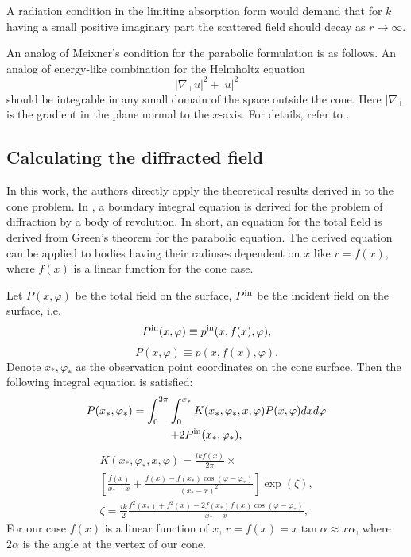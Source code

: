 \documentclass{procDDs}
\begin{document}
A radiation condition in the limiting absorption form would demand that for $k$ having a small positive imaginary part the scattered field should decay as $r \rightarrow \infty$.

An analog of Meixner's condition for the parabolic formulation is as follows. An analog of energy-like combination for the Helmholtz equation 
\begin{equation}
|\nabla_\perp u|^2 + |u|^2
\end{equation}
should be integrable in any small domain of the space outside the cone. Here $|\nabla_\perp$ is the gradient in the plane normal to the $x$-axis. For details, refer to \cite{Shanin_parabolic}.

\subsection{Calculating the diffracted field}

In this work, the authors directly apply the theoretical results derived in \cite{Shanin_parabolic} to the cone problem. In \cite{Shanin_parabolic}, a boundary integral equation is derived for the problem of diffraction by a body of revolution. In short, an equation for the total field is derived from Green's theorem for the parabolic equation. The derived equation can be applied to bodies having their radiuses dependent on $x$ like $r = f(x)$, where $f(x)$ is a linear function for the cone case.

Let $P(x,\varphi)$ be the total field on the surface, $P^{\rm in}$ be the incident field on the surface, i.e. 
\begin{equation}
P^{\rm in}(x,\varphi) \equiv p^{\rm in}(x,f(x),\varphi),
\end{equation}
\begin{equation}
P(x,\varphi) \equiv p(x,f(x),\varphi).
\end{equation}
 Denote $x_*, \varphi_*$ as the observation point coordinates on the cone surface. Then the following integral equation is satisfied:
\begin{multline}\label{int_eq} 
P(x_*, \varphi_*) = \int_{0}^{2\pi}\int_{0}^{x_*} K(x_*, \varphi_*, x, \varphi) P(x, \varphi) dx d\varphi \\
+ 2P^{\rm in}(x_*, \varphi_*),
\end{multline}
\begin{multline} \label{int_ker}                   
K(x_*, \varphi_*, x, \varphi) = \frac{ikf(x)}{2\pi} \times \\
\left[ \frac{\dot{f}(x)}{x_* - x} +\frac{f(x) - f(x_*) \cos(\varphi - \varphi_*)}{(x_* - x)^2}\right] \exp(\zeta),\\
\zeta =   \frac{ik}{2} \frac{f^2(x_*) + f^2(x) - 2f(x_*) f(x) \cos(\varphi - \varphi_*)}{x_* - x} ,
\end{multline}
For our case $f(x)$ is a linear function of $x$, $r = f(x) = x\tan\alpha  \approx x \alpha $, where $2\alpha$ is the angle at the vertex of our cone.
\end{document}
